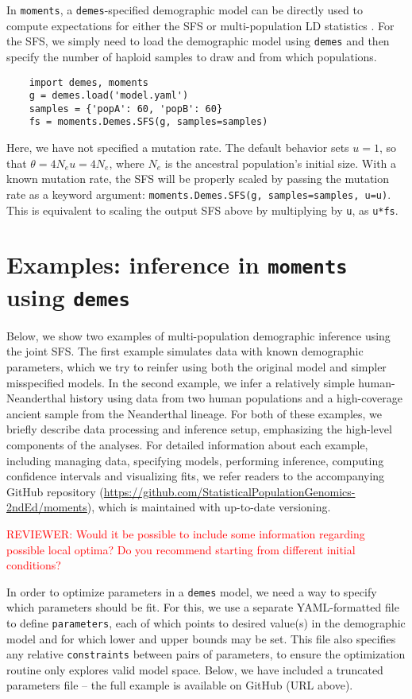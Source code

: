 \documentclass[]{article}
\newcommand{\reviewercomment}[1]{{\textcolor{red}{REVIEWER: #1}}}
\newcommand{\moments}{\texttt{moments}\xspace}
\newcommand{\demes}{\texttt{demes}\xspace}
\begin{document}
In \moments, a \demes-specified demographic model can be directly used to
compute expectations for either the SFS or multi-population LD statistics
\cite{ragsdale2019models, ragsdale2020unbiased}. For the SFS, we simply need
to load the demographic model using \demes and then specify the number of
haploid samples to draw and from which populations.
\begin{verbatim}
    import demes, moments
    g = demes.load('model.yaml')
    samples = {'popA': 60, 'popB': 60}
    fs = moments.Demes.SFS(g, samples=samples)
\end{verbatim}
Here, we have not specified a mutation rate. The default behavior sets $u=1$,
so that $\theta = 4N_eu=4N_e$, where $N_e$ is the ancestral population's
initial size. With a known mutation rate, the SFS will be properly scaled by
passing the mutation rate as a keyword argument: \texttt{moments.Demes.SFS(g,
samples=samples, u=u)}. This is equivalent to scaling the output SFS above by
multiplying by \texttt{u}, as \texttt{u*fs}.

\section*{Examples: inference in \moments using \demes}

Below, we show two examples of multi-population demographic inference using the
joint SFS. The first example simulates data with known demographic parameters,
which we try to reinfer using both the original model and simpler
misspecified models. In the second example, we infer a relatively simple
human-Neanderthal history using data from two human populations and a
high-coverage ancient sample from the Neanderthal lineage. For both of these
examples, we briefly describe data processing and inference setup, emphasizing
the high-level components of the analyses. For detailed information about each
example, including managing data, specifying models, performing inference,
computing confidence intervals and visualizing fits, we refer readers to the
accompanying GitHub repository
(\url{https://github.com/StatisticalPopulationGenomics-2ndEd/moments}), which
is maintained with up-to-date versioning.

\reviewercomment{Would it be possible to include some information regarding possible local optima? Do you recommend starting from different initial conditions?}

In order to optimize parameters in a \demes model, we need a way to specify
which parameters should be fit. For this, we use a separate YAML-formatted file
to define \texttt{parameters}, each of which points to desired value(s) in the
demographic model and for which lower and upper bounds may be set. This file
also specifies any relative \texttt{constraints} between pairs of parameters,
to ensure the optimization routine only explores valid model space. Below, we
have included a truncated parameters file -- the full example is available on
GitHub (URL above).
\end{document}
